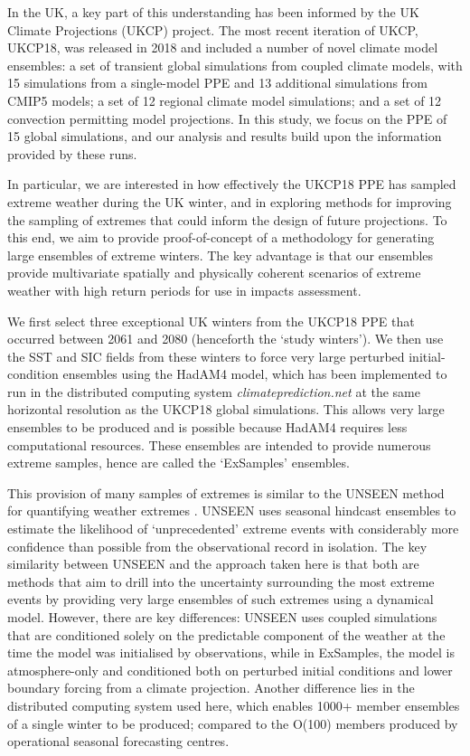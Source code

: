   In the UK, a key part of this understanding has been informed by the UK Climate Projections (UKCP) project. The most recent iteration of UKCP, UKCP18, was released in 2018 \citep{lowe_ukcp18_2018,murphy_ukcp18_2018} and included a number of novel climate model ensembles: a set of transient global simulations from coupled climate models, with 15 simulations from a single-model PPE and 13 additional simulations from CMIP5 models; a set of 12 regional climate model simulations; and a set of 12 convection permitting model projections. In this study, we focus on the PPE of 15 global simulations, and our analysis and results build upon the information provided by these runs.

  In particular, we are interested in how effectively the UKCP18 PPE has sampled extreme weather during the UK winter, and in exploring methods for improving the sampling of extremes that could inform the design of future projections. To this end, we aim to provide proof-of-concept of a methodology for generating large ensembles of extreme winters. The key advantage is that our ensembles provide multivariate spatially and physically coherent scenarios of extreme weather with high return periods for use in impacts assessment.

  We first select three exceptional UK winters from the UKCP18 PPE that occurred between 2061 and 2080 (henceforth the `study winters'). We then use the SST and SIC fields from these winters to force very large perturbed initial-condition ensembles using the HadAM4 model, which has been implemented to run in the distributed computing system \emph{climateprediction.net} at the same horizontal resolution as the UKCP18 global simulations. This allows very large ensembles to be produced and is possible because HadAM4 requires less computational resources. These ensembles are intended to provide numerous extreme samples, hence are called the `ExSamples' ensembles.

  This provision of many samples of extremes is similar to the UNSEEN method for quantifying weather extremes \citep{kelder_using_2020,thompson_high_2017}. UNSEEN uses seasonal hindcast ensembles to estimate the likelihood of `unprecedented' extreme events with considerably more confidence than possible from the observational record in isolation. The key similarity between UNSEEN and the approach taken here is that both are methods that aim to drill into the uncertainty surrounding the most extreme events by providing very large ensembles of such extremes using a dynamical model. However, there are key differences: UNSEEN uses coupled simulations that are conditioned solely on the predictable component of the weather at the time the model was initialised by observations, while in ExSamples, the model is atmosphere-only and conditioned both on perturbed initial conditions and lower boundary forcing from a climate projection. Another difference lies in the distributed computing system used here, which enables 1000+ member ensembles of a single winter to be produced; compared to the O(100) members produced by operational seasonal forecasting centres.

